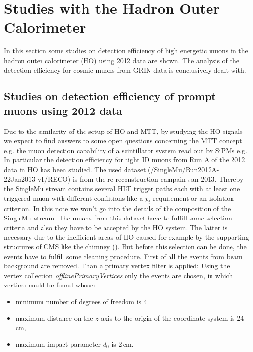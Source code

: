 \section{Studies with the Hadron Outer Calorimeter}
	In this section some studies on detection efficiency of high energetic muons in the hadron outer calorimeter (HO) using 2012 data are shown.
	The analysis of the detection efficiency for cosmic muons from GRIN data is conclusively dealt with.
	\subsection{Studies on detection efficiency of prompt muons using 2012 data}
		Due to the similarity of the setup of HO and MTT, by studying the HO signals we expect to find answers to some open questions concerning the MTT concept e.g. the muon detection capability of a
		scintillator system read out by SiPMs e.g.
		In particular the detection efficiency for tight ID muons from Run A of the 2012 data in HO has been studied.
		The used dataset (/SingleMu/Run2012A-22Jan2013-v1/RECO) is from the re-reconstruction campain Jan 2013.
		Thereby the SingleMu stream contains several HLT trigger paths each with at least one triggered muon with different conditions like a $p_t$ requirement or an isolation criterion.
		In this note we won't go into the details of the composition of the SingleMu stream. 
		The muons from this dataset have to fulfill some selection criteria and also they have to be accepted by the HO system.
		The latter is necessary due to the inefficient areas of HO caused for example by the supporting structures of CMS like the chimney (\cite{JINST}).
		But before this selection can be done, the events have to fulfill some cleaning procedure.
		First of all the events from beam background are removed.
		Than a primary vertex filter is applied:
		Using the vertex collection \textit{offlinePrimaryVertices} only the events are chosen, in which vertices could be found whose:
			\begin{itemize}
				\item minimum number of degrees of freedom is 4,
				\item maximum distance on the $z$ axis to the origin of the coordinate system is 24\,cm,
				\item maximum impact parameter $d_0$ is 2\,cm.
			\end{itemize}
